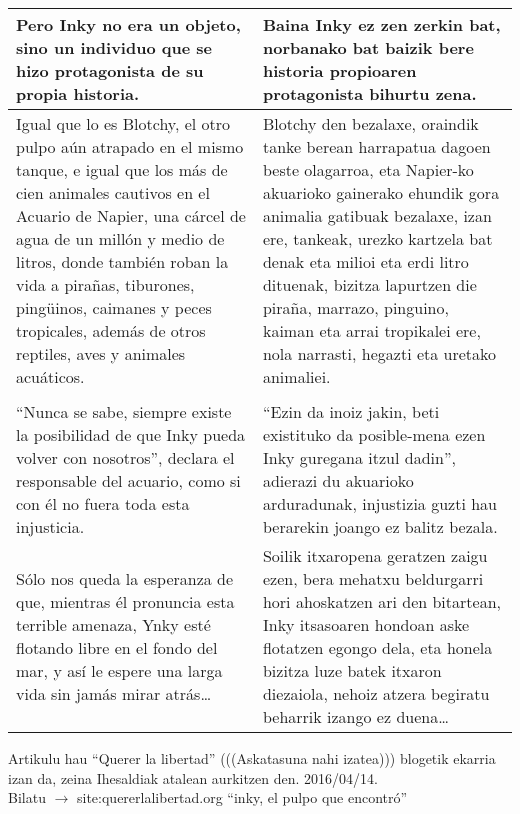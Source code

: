 \documentclass{article}
\begin{document}
\begin{center}
\begin{longtable}{|p{6cm}|p{6cm}|}
  \midrule
  Pero Inky no era un objeto, sino un individuo que se hizo protagonista de su propia historia.&
  Baina Inky ez zen zerkin bat, norbanako bat baizik bere historia propioaren protagonista bihurtu zena.\\

  \midrule
  Igual que lo es Blotchy, el otro pulpo aún atrapado en el mismo tanque, e igual que los más de cien animales cautivos en el Acuario de Napier, una cárcel de agua de un millón y medio de litros, donde también roban la vida a pirañas, tiburones, pingüinos, caimanes y peces tropicales, además de otros reptiles, aves y animales acuáticos.&
  Blotchy den bezalaxe, oraindik tanke berean harrapatua dagoen beste olagarroa, eta Napier-ko akuarioko gainerako ehundik gora animalia gatibuak bezalaxe, izan ere, tankeak, urezko kartzela bat denak eta milioi eta erdi litro dituenak, bizitza lapurtzen die piraña, marrazo, pinguino, kaiman eta arrai tropikalei ere, nola narrasti, hegazti eta uretako animaliei.\\

  \midrule
  \cellcolor{lightgray}{\textbf{Párrafo}} &
  \cellcolor{lightgray}{\textbf{Paragrafoa}}\\
  
  \midrule
  ``Nunca se sabe, siempre existe la posibilidad de que Inky pueda volver con nosotros'', declara el responsable del acuario, como si con él no fuera toda esta injusticia.&
  ``Ezin da inoiz jakin, beti existituko da posible-mena ezen Inky guregana itzul dadin'', adierazi du akuarioko arduradunak, injustizia guzti hau berarekin joango ez balitz bezala.\\

  \midrule
  Sólo nos queda la esperanza de que, mientras él pronuncia esta terrible amenaza, Ynky esté flotando libre en el fondo del mar, y así le espere una larga vida sin jamás mirar atrás\ldots&
  Soilik itxaropena geratzen zaigu ezen, bera mehatxu beldurgarri hori ahoskatzen ari den bitartean, Inky itsasoaren hondoan aske flotatzen egongo dela, eta honela bizitza luze batek itxaron diezaiola, nehoiz atzera begiratu beharrik izango ez duena\ldots\\

  \bottomrule
\end{longtable}
\end{center}


\begin{center}
  Artikulu hau ``Querer la libertad'' (((Askatasuna nahi izatea))) blogetik ekarria izan da, zeina Ihesaldiak atalean aurkitzen den. 2016/04/14. \\
  Bilatu $\rightarrow$ site:quererlalibertad.org ``inky, el pulpo que encontró''
\end{center}
\end{document}
